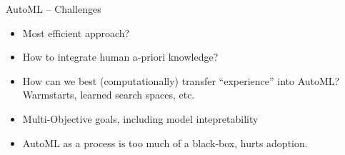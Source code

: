 \begin{frame}{AutoML -- Challenges}
\begin{itemize}
    \item Most efficient approach? 
    \item How to integrate human a-priori knowledge?
    \item How can we best (computationally) transfer ``experience'' into AutoML?
    Warmstarts, learned search spaces, etc. 
    \item Multi-Objective goals, including model intepretability
    \item AutoML as a process is too much of a black-box, hurts adoption.
\end{itemize}
\end{frame}


\endlecture

